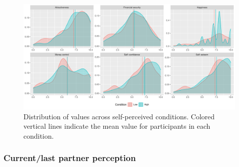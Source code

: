 \documentclass[
  bookmarksnumbered]{article}
\begin{document}
\begin{figure}
\centering
\includegraphics{Supplementary_material_files/figure-latex/psych-desc-plot-1.pdf}
\caption{\label{fig:psych-desc-plot}Distribution of values across self-perceived conditions. Colored vertical lines indicate the mean value for participants in each condition.}
\end{figure}

\subsubsection{Current/last partner perception}\label{currentlast-partner-perception}
\end{document}
